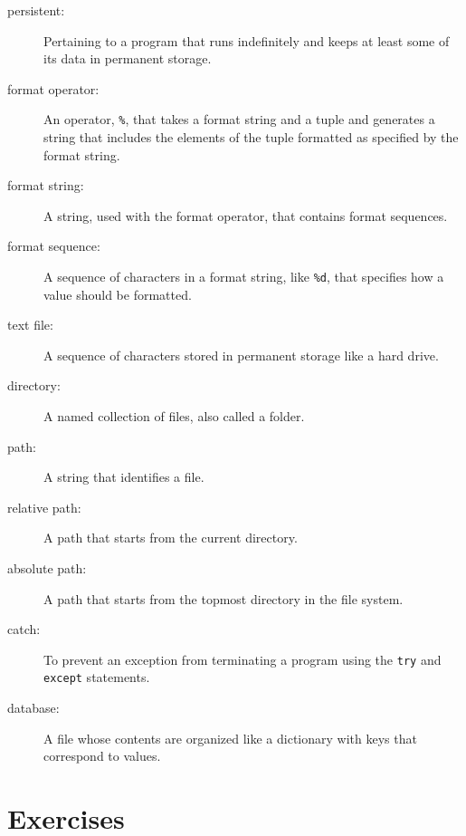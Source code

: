\documentclass[10pt]{book}
\begin{document}
\begin{description}

\item[persistent:] Pertaining to a program that runs indefinitely
and keeps at least some of its data in permanent storage.

\item[format operator:] An operator, {\tt \%}, that takes a format
string and a tuple and generates a string that includes
the elements of the tuple formatted as specified by the format string.

\item[format string:] A string, used with the format operator, that
contains format sequences.  

\item[format sequence:] A sequence of characters in a format string,
like {\tt \%d}, that specifies how a value should be formatted.

\item[text file:] A sequence of characters stored in permanent
storage like a hard drive.

\item[directory:] A named collection of files, also called a folder.

\item[path:] A string that identifies a file.

\item[relative path:] A path that starts from the current directory.

\item[absolute path:] A path that starts from the topmost directory
in the file system.

\item[catch:] To prevent an exception from terminating
a program using the {\tt try}
and {\tt except} statements.

\item[database:] A file whose contents are organized like a dictionary
with keys that correspond to values.

\end{description}


\section{Exercises}
\end{document}
